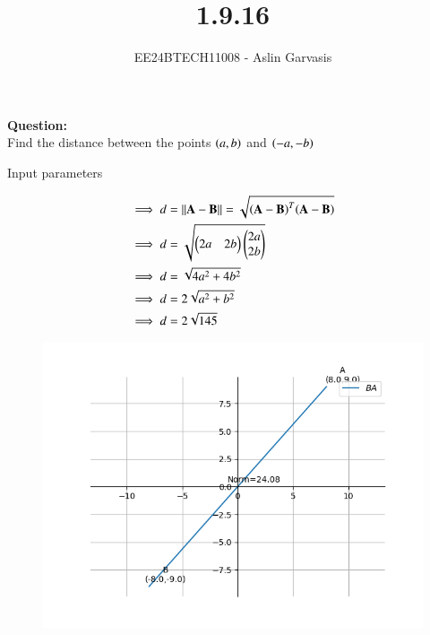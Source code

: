 \documentclass[journal]{IEEEtran}
\begin{document}

\vspace{3cm}
\title{1.9.16}
\author{EE24BTECH11008 - Aslin Garvasis
}
{\let\newpage\relax\maketitle}

\renewcommand{\thefigure}{\theenumi}
\renewcommand{\thetable}{\theenumi}
\setlength{\intextsep}{10pt} %


\renewcommand{\thetable}{\theenumi}
 \textbf{Question:}\\Find the distance between the points $\left(a,b\right)$ and $\left(-a,-b\right)$ 
 
 \solution 
 \begin{table}[h!]    
  \centering
  
  \caption{Input parameters}
  \label{tab1.1.9.16}
\end{table}
\begin{align}
\implies d&=\left\lVert \mathbf A-\mathbf B\right\rVert=\sqrt{\mathbf{\left(A-B\right)}^T\mathbf{\left(A-B\right)}}\\ 
	\implies d&=\sqrt{\begin{pmatrix}2a&2b\end{pmatrix}\begin{pmatrix}2a\\2b\end{pmatrix}}\\
	\implies d&=\sqrt{4a^2+4b^2}\\ 
	\implies d&=2\sqrt{a^2+b^2}\\
	\implies d&=2\sqrt{145}
\end{align}
\begin{figure}[h!]
                \centering
               \includegraphics[width=0.7\linewidth]{Figs/Fig1.png}
               \label{stemplot}
               \end{figure}
\end{document}
